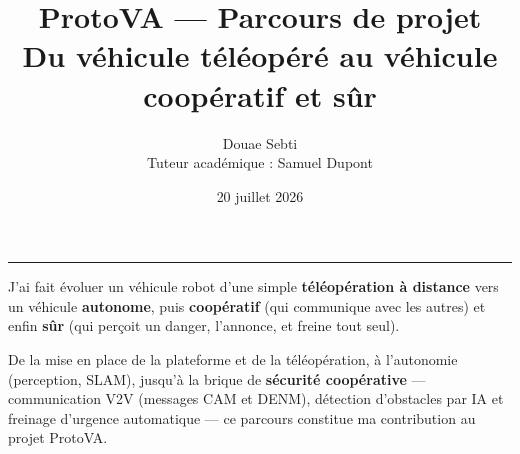 \documentclass[a4paper,11pt]{article}
\title{\textbf{ProtoVA --- Parcours de projet}\\[5pt]
  {\large\mdseries Du véhicule téléopéré au véhicule coopératif et sûr}}
\author{Douae Sebti \\[2pt] {\small Tuteur académique : Samuel Dupont}}
\date{20 juillet 2026}
\begin{document}
\maketitle
\vspace{-2pt}
\begin{center}\rule{0.96\textwidth}{0.4pt}\end{center}
\vspace{3pt}

\begin{note}
J'ai fait évoluer un véhicule robot d'une simple \textbf{téléopération à distance} vers un
véhicule \textbf{autonome}, puis \textbf{coopératif} (qui communique avec les autres) et enfin
\textbf{sûr} (qui perçoit un danger, l'annonce, et freine tout seul).
\end{note}

\begin{note}[Ma contribution]
De la mise en place de la plateforme et de la téléopération, à l'autonomie (perception, SLAM),
jusqu'à la brique de \textbf{sécurité coopérative} --- communication V2V (messages CAM et DENM),
détection d'obstacles par IA et freinage d'urgence automatique --- ce parcours constitue ma
contribution au projet ProtoVA.
\end{note}

\end{document}
